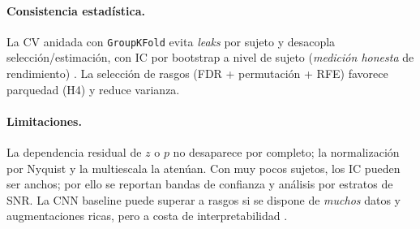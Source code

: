 \paragraph{Consistencia estadística.} La CV anidada con \texttt{GroupKFold} evita \emph{leaks} por sujeto y desacopla selección/estimación, con IC por bootstrap a nivel de sujeto (\emph{medición honesta} de rendimiento) \cite{Tsamardinos2022Patterns}. La selección de rasgos (FDR + permutación + RFE) favorece parquedad (H4) y reduce varianza.

\paragraph{Limitaciones.} La dependencia residual de $z$ o $p$ no desaparece por completo; la normalización por Nyquist y la multiescala la atenúan. Con muy pocos sujetos, los IC pueden ser anchos; por ello se reportan bandas de confianza y análisis por estratos de SNR. La CNN baseline puede superar a rasgos si se dispone de \emph{muchos} datos y augmentaciones ricas, pero a costa de interpretabilidad \cite{Alzubaidi2020Electronics}.

